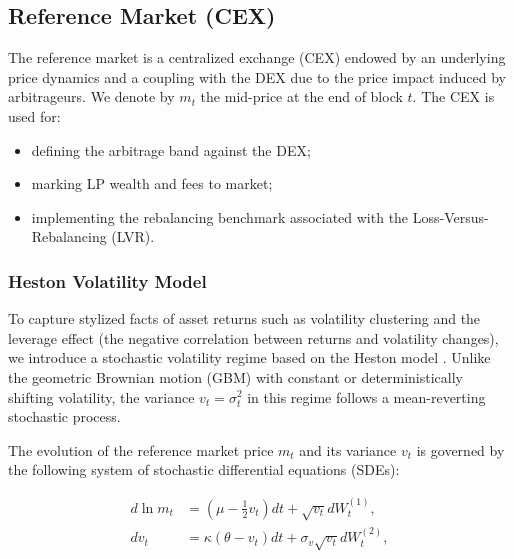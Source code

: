 \documentclass[11pt]{article}
\begin{document}
\subsection{Reference Market (CEX)}
\label{subsec:cex}

The reference market is a centralized exchange (CEX) endowed by an underlying price dynamics
and a coupling with the DEX due to the price impact induced by arbitrageurs.
We denote by $m_t$ the mid-price at the end of block $t$. The CEX is used for:
\begin{itemize}[leftmargin=*]
  \item defining the arbitrage band against the DEX;
  \item marking LP wealth and fees to market;
  \item implementing the rebalancing benchmark associated with the Loss-Versus-Rebalancing (LVR).
\end{itemize}

\subsubsection{Heston Volatility Model}

To capture stylized facts of asset returns such as volatility clustering and the leverage effect (the negative correlation 
between returns and volatility changes), we introduce a stochastic volatility regime based on the Heston model \cite{heston1993}. Unlike the
geometric Brownian motion (GBM) with constant or deterministically shifting volatility, the variance $v_t = \sigma_t^2$ in 
this regime follows a mean-reverting stochastic process.

The evolution of the reference market price $m_t$ and its variance $v_t$ is governed by the following system of stochastic 
differential equations (SDEs):

\begin{align}
    d \ln m_t &= \left(\mu - \frac{1}{2}v_t\right)dt + \sqrt{v_t} dW_t^{(1)}, \\
    dv_t &= \kappa(\theta - v_t)dt + \sigma_v \sqrt{v_t} dW_t^{(2)},
    \label{eq:heston_dynamics}
\end{align}
\end{document}
